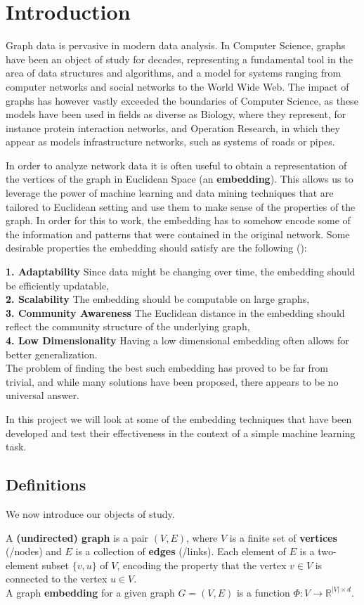 \section{Introduction}
Graph data is pervasive in modern data analysis. In Computer Science, graphs have been an object of study for decades, representing a fundamental tool in the area of data structures and algorithms, and a model for systems ranging from computer networks and social networks to the World Wide Web. The impact of graphs has however vastly exceeded the boundaries of Computer Science, as these models have been used in fields as diverse as Biology, where they represent, for instance protein interaction networks, and Operation Research, in which they appear as models infrastructure networks, such as systems of roads or pipes.

In order to analyze network data it is often useful to obtain a representation of the vertices of the graph in Euclidean Space (an \textbf{embedding}). This allows us to leverage the power of machine learning and data mining techniques that are tailored to Euclidean setting and use them to make sense of the properties of the graph. In order for this to work, the embedding has to somehow encode some of the information and patterns that were contained in the original network. Some desirable properties the embedding should satisfy are the following (\cite{chen2018tutorial}):

\textbf{1. Adaptability} Since data might be changing over time, the embedding should be efficiently updatable,\\
\textbf{2. Scalability} The embedding should be computable on large graphs,\\
\textbf{3. Community Awareness} The Euclidean distance in the embedding should reflect the community structure of the underlying graph,\\
\textbf{4. Low Dimensionality} Having a low dimensional embedding often allows for better generalization.\\


The problem of finding the best such embedding has proved to be far from trivial, and while many solutions have been proposed, there appears to be no universal answer.

In this project we will look at some of the embedding techniques that have been developed and test their effectiveness in the context of a simple machine learning task.


\subsection{Definitions}
We now introduce our objects of study.

A \textbf{(undirected) graph} is a pair $(V,E)$, where $V$ is a finite set of \textbf{vertices} (/nodes) and $E$ is a collection of \textbf{edges} (/links). Each element of $E$ is a two-element subset $\{v,u\}$ of $V$, encoding the property that the vertex $v \in V$ is connected to the vertex $u \in V$.\\

A graph \textbf{embedding} for a given graph $G = (V,E)$ is a function $\Phi:V \to \mathbb{R}^{|V| \times d}$.
